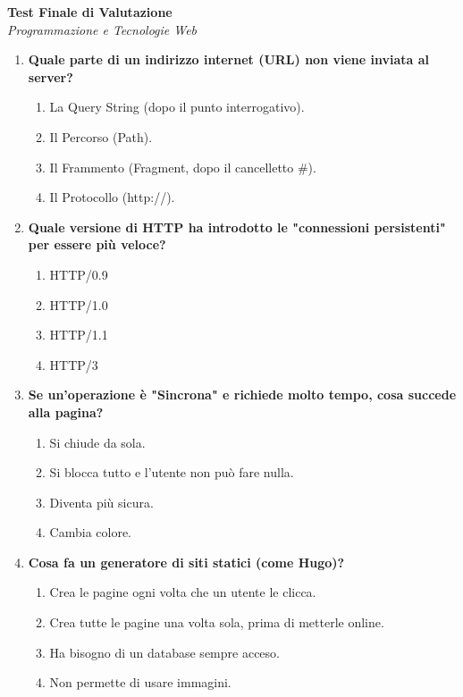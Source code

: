 \documentclass[11pt,a4paper]{article}
\begin{document}
\begin{center}
    {\Large \textbf{\color{primary} Test Finale di Valutazione}} \\
    \textit{Programmazione e Tecnologie Web}
\end{center}

\vspace{0.5cm}

\begin{enumerate}[label=\textbf{\arabic*.}, leftmargin=1.5em, itemsep=1.5em]

    \item \textbf{Quale parte di un indirizzo internet (URL) non viene inviata al server?}
    \begin{enumerate}[label=\alph*)]
        \item La Query String (dopo il punto interrogativo).
        \item Il Percorso (Path).
        \item Il Frammento (Fragment, dopo il cancelletto \#).
        \item Il Protocollo (http://).
    \end{enumerate}

    \item \textbf{Quale versione di HTTP ha introdotto le "connessioni persistenti" per essere più veloce?}
    \begin{enumerate}[label=\alph*)]
        \item HTTP/0.9
        \item HTTP/1.0
        \item HTTP/1.1
        \item HTTP/3
    \end{enumerate}

    \item \textbf{Se un'operazione è "Sincrona" e richiede molto tempo, cosa succede alla pagina?}
    \begin{enumerate}[label=\alph*)]
        \item Si chiude da sola.
        \item Si blocca tutto e l'utente non può fare nulla.
        \item Diventa più sicura.
        \item Cambia colore.
    \end{enumerate}

    \item \textbf{Cosa fa un generatore di siti statici (come Hugo)?}
    \begin{enumerate}[label=\alph*)]
        \item Crea le pagine ogni volta che un utente le clicca.
        \item Crea tutte le pagine una volta sola, prima di metterle online.
        \item Ha bisogno di un database sempre acceso.
        \item Non permette di usare immagini.
    \end{enumerate}


\end{enumerate}
\end{document}
